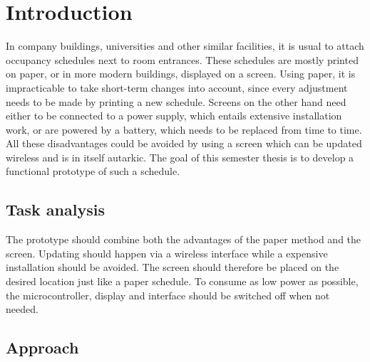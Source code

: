 \chapter{Introduction}
In company buildings, universities and other similar facilities, it is usual to attach occupancy schedules next to room entrances.
These schedules are mostly printed on paper, or in more modern buildings, displayed on a screen.
Using paper, it is impracticable to take short-term changes into account, since every adjustment needs to be made by printing a new schedule.
Screens on the other hand need either to be connected to a power supply, which entails extensive installation work, or are powered by a battery, which needs to be replaced from time to time.
All these disadvantages could be avoided by using a screen which can be updated wireless and is in itself autarkic.
The goal of this semester thesis is to develop a functional prototype of such a schedule.

\section{Task analysis}
The prototype should combine both the advantages of the paper method and the screen.
Updating should happen via a wireless interface while a expensive installation should be avoided.
The screen should therefore be placed on the desired location  just like a paper schedule.
To consume as low power as possible, the microcontroller, display and interface should be switched off when not needed.

\section{Approach}

